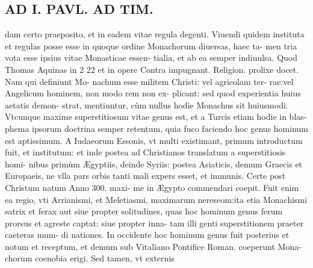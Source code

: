 \documentclass{article}
\begin{document}
\begin{pages}
\section*{AD I. PAVL. AD TIM. }
\marginpar{[ p.214 ]}\pstart dam certo praeposito, et in eadem vitae regula degenti.  \pend\pstart Viuendi quidem instituta et regulas posse esse in quoque  ordine Monachorum diuersas, haec ta- men tria vota esse ipsius vitae Monasticae essen- tialia, et ab ea semper indiuulsa. Quod Thomas Aquinas in 2 22 et in opere Contra impugnant. Religion. prolixe docet. Nam qui definiunt Mo- nachum esse militem Christi: vel agricolam ter- rae:vel Angelicum hominem, non modo rem non ex- plicant: sed quod experientia huius aetatis demon- strat, mentiuntur, cùm nullus hodie Monachus sit huiusmodi. Vtcunque maxime superstitiosum vitae genus est, et a Turcis etiam hodie in blas- phema ipsorum doctrina semper retentum, quia fuco faciendo hoc genus hominum est aptissimum. A Iudaeorum Essonis, vt multi existimant, primum introductum fuit, et institutum: et inde postea ad Christianos translatum a superstitiosis homi- nibus primùm Ægyptiis, deinde Syriis: postea Asiaticis, demum Graecis et Europaeis, ne vlla pars orbis tanti mali expers esset, et immunis. Certe post Christum natum Anno 300. maxi- me in Ægypto commendari coepit. Fuit enim ea regio, vti Arrianismi, et Meletiasmi, maximarum nereseom:ita etia Monachismi satrix et ferax aut siue propter solitudines, quas hoc hominum genus ferum prorsus et agreste captat: siue propter inna- tam illi genti superstitionem praeter caeteras mum- di nationes. In occidente hoc hominum genus fuit posterius et notum et receptum, et demum sub Vitaliano Pontifice Roman. coeperunt Mona- chorum coenobia erigi. Sed tamen, vt externis  \pend

\end{pages}
\end{document}

